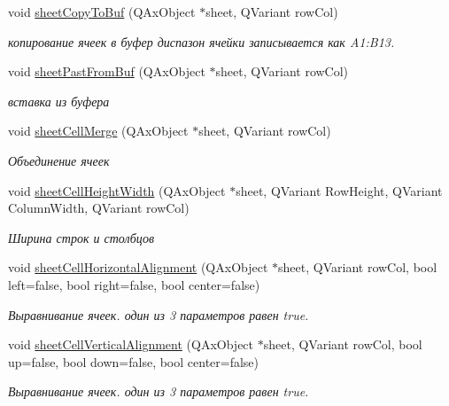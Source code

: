 \begin{DoxyCompactItemize}
void \hyperlink{class_active_excel_ab2ef703bfeed8edd98005bff2fafa0b3}{sheet\+Copy\+To\+Buf} (Q\+Ax\+Object $\ast$sheet, Q\+Variant row\+Col)
\begin{DoxyCompactList}\small\item\em копирование ячеек в буфер диспазон ячейки записывается как A1\+:B13. \end{DoxyCompactList}\item 
void \hyperlink{class_active_excel_a1d363f3394905392c98e3ba78bc6588a}{sheet\+Past\+From\+Buf} (Q\+Ax\+Object $\ast$sheet, Q\+Variant row\+Col)
\begin{DoxyCompactList}\small\item\em вставка из буфера \end{DoxyCompactList}\item 
void \hyperlink{class_active_excel_a98c0020e0eabd459872b07a0247e2482}{sheet\+Cell\+Merge} (Q\+Ax\+Object $\ast$sheet, Q\+Variant row\+Col)
\begin{DoxyCompactList}\small\item\em Объединение ячеек \end{DoxyCompactList}\item 
void \hyperlink{class_active_excel_a5c4341cd4fd4eaceab92eef20991b0ab}{sheet\+Cell\+Height\+Width} (Q\+Ax\+Object $\ast$sheet, Q\+Variant Row\+Height, Q\+Variant Column\+Width, Q\+Variant row\+Col)
\begin{DoxyCompactList}\small\item\em Ширина строк и столбцов \end{DoxyCompactList}\item 
void \hyperlink{class_active_excel_a07229b0542e5fa9bbb8d795a1c84c831}{sheet\+Cell\+Horizontal\+Alignment} (Q\+Ax\+Object $\ast$sheet, Q\+Variant row\+Col, bool left=false, bool right=false, bool center=false)
\begin{DoxyCompactList}\small\item\em Выравнивание ячеек. один из 3 параметров равен true. \end{DoxyCompactList}\item 
void \hyperlink{class_active_excel_a5c0660c91b28d1d7ce550789104c90e9}{sheet\+Cell\+Vertical\+Alignment} (Q\+Ax\+Object $\ast$sheet, Q\+Variant row\+Col, bool up=false, bool down=false, bool center=false)
\begin{DoxyCompactList}\small\item\em Выравнивание ячеек. один из 3 параметров равен true. \end{DoxyCompactList}\end{DoxyCompactItemize}


